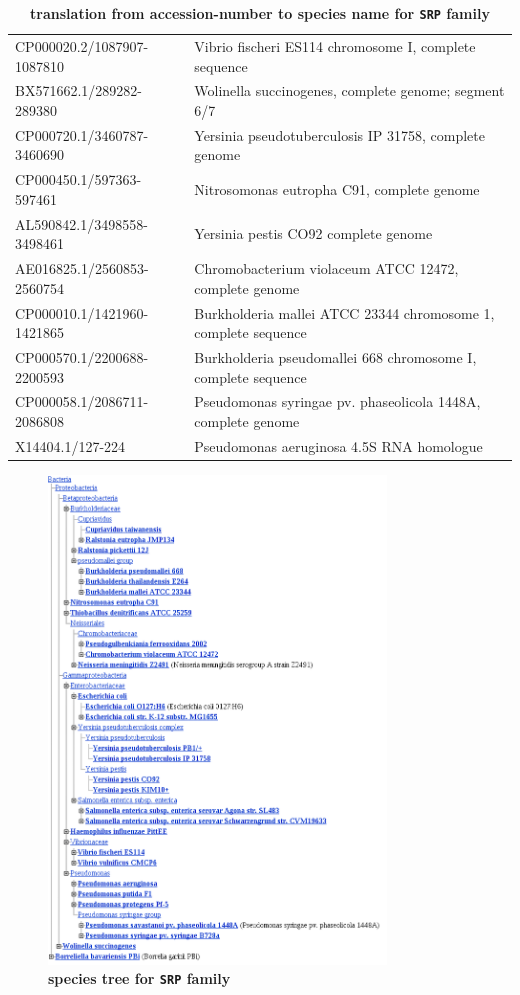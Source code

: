 \documentclass[ twoside,openright,titlepage,numbers=noenddot,headinclude,%
                footinclude=false, cleardoublepage=empty,abstractoff, %
                BCOR=5mm,paper=a4,fontsize=11pt,%
                ngerman,american,%
                ]{scrreprt}
\begin{document}
\begin{table}
\begin{tabular}{l|l}
CP000020.2/1087907-1087810 	&Vibrio fischeri ES114 chromosome I, complete sequence\\
BX571662.1/289282-289380 	&Wolinella succinogenes, complete genome; segment 6/7\\
CP000720.1/3460787-3460690 	&Yersinia pseudotuberculosis IP 31758, complete genome\\
CP000450.1/597363-597461 	&Nitrosomonas eutropha C91, complete genome\\
AL590842.1/3498558-3498461 	&Yersinia pestis CO92 complete genome\\
AE016825.1/2560853-2560754 	&Chromobacterium violaceum ATCC 12472, complete genome\\
CP000010.1/1421960-1421865 	&Burkholderia mallei ATCC 23344 chromosome 1, complete sequence\\
CP000570.1/2200688-2200593 	&Burkholderia pseudomallei 668 chromosome I, complete sequence\\
CP000058.1/2086711-2086808 	&Pseudomonas syringae pv. phaseolicola 1448A, complete genome\\
X14404.1/127-224 		&Pseudomonas aeruginosa 4.5S RNA homologue\\
\end{tabular}
\caption{{\bf translation from accession-number to species name for \texttt{SRP} family }}
\label{table:SRPAcessionToSpeciesName}
\end{table}

\begin{figure}
\includegraphics[width=0.8\textwidth]{./Appendix/SRP_SpeciesTree}
\caption{{\bf species tree for \texttt{SRP} family}}
\label{fig:SRPSpeciesTree}
\end{figure}




\end{document}
